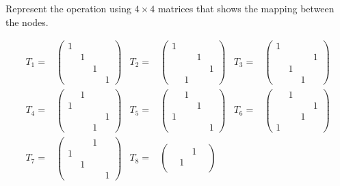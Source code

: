 \documentclass[10pt,fleqn]{article}
\newcommand{\eqar}[1]
{
  \begin{align*}
    #1
  \end{align*}
}
\begin{document}
\section{}
\subsection{}
Represent the operation using $4\times4$ matrices that shows the mapping between
the nodes.
\eqar{
  T_1=&\begin{pmatrix}
    1&&&\\
    &1&&\\
    &&1&\\
    &&&1
  \end{pmatrix}&T_2=&\begin{pmatrix}
    1&&&\\
    &&1&\\
    &&&1\\
    &1&&
  \end{pmatrix}&T_3=&\begin{pmatrix}
    1&&&\\
    &&&1\\
    &1&&\\
    &&1&
  \end{pmatrix}\\
  T_4=&\begin{pmatrix}
    &1&&\\
    1&&&\\
    &&&1\\
    &&1&
  \end{pmatrix}&T_5=&\begin{pmatrix}
    &1&&\\
    &&1&\\
    1&&&\\
    &&&1
  \end{pmatrix}&T_6=&\begin{pmatrix}
    &1&&\\
    &&&1\\
    &&1&\\
    1&&&
  \end{pmatrix}\\
  T_7=&\begin{pmatrix}
    &&1&\\
    1&&&\\
    &1&&\\
    &&&1
  \end{pmatrix}&T_8=&\begin{pmatrix}
    &&1&\\
    &1&&\\

\end{pmatrix}}
\end{document}
